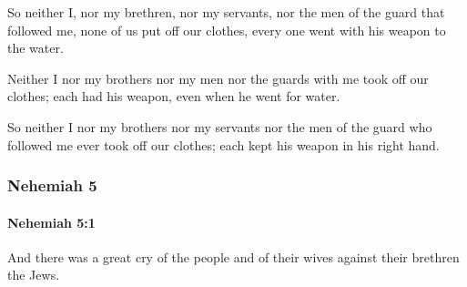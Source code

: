 			\begin{versebox}
					\item[BHS] 
					\item[LXX] 
					\item[ASV] So neither I, nor my brethren, nor my servants, nor the men of the guard that followed me, none of us put off our clothes, every one went with his weapon to the water.
					\item[NIV] Neither I nor my brothers nor my men nor the guards with me took off our clothes; each had his weapon, even when he went for water.
					\item[NRSV] So neither I nor my brothers nor my servants nor the men of the guard who followed me ever took off our clothes; each kept his weapon in his right hand.
			\end{versebox}
	\subsubsection{Nehemiah 5} %
		\label{NEHEMIAH-5}

		\paragraph{Nehemiah 5:1} %
			\label{NEHEMIAH-5-1}

			And there was a great cry of the people and of their wives against their brethren the Jews.

